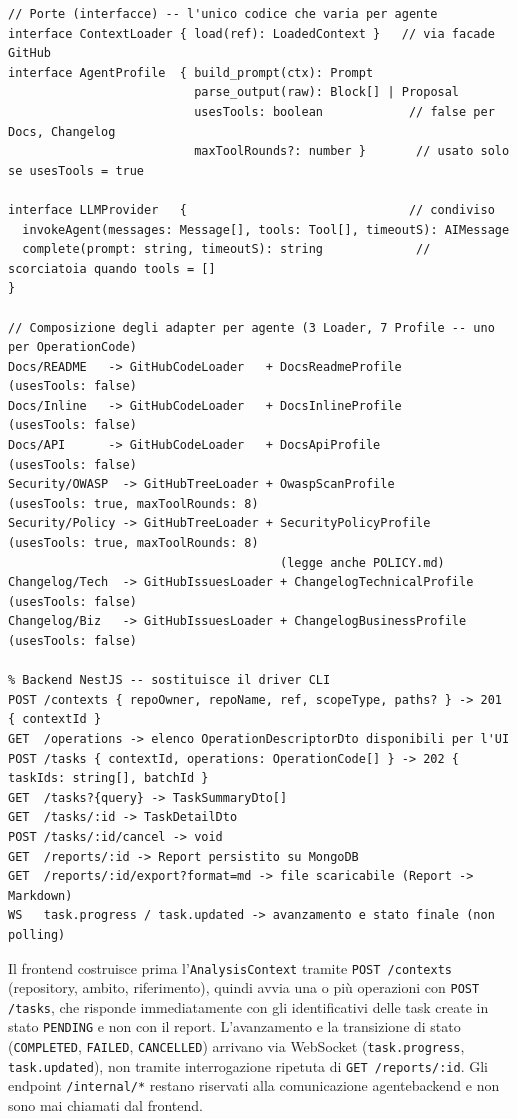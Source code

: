 \documentclass[11pt,a4paper]{article}
\begin{document}
\begin{lstlisting}[caption={Porte dell'agente e composizione degli adapter. ContextLoader e AgentProfile variano per agente; il ciclo di tool-calling è parte dello scheletro condiviso ma è attivo solo per i profili con usesTools=true.}]
// Porte (interfacce) -- l'unico codice che varia per agente
interface ContextLoader { load(ref): LoadedContext }   // via facade GitHub
interface AgentProfile  { build_prompt(ctx): Prompt
                          parse_output(raw): Block[] | Proposal
                          usesTools: boolean            // false per Docs, Changelog
                          maxToolRounds?: number }       // usato solo se usesTools = true

interface LLMProvider   {                               // condiviso
  invokeAgent(messages: Message[], tools: Tool[], timeoutS): AIMessage
  complete(prompt: string, timeoutS): string             // scorciatoia quando tools = []
}

// Composizione degli adapter per agente (3 Loader, 7 Profile -- uno per OperationCode)
Docs/README   -> GitHubCodeLoader   + DocsReadmeProfile        (usesTools: false)
Docs/Inline   -> GitHubCodeLoader   + DocsInlineProfile        (usesTools: false)
Docs/API      -> GitHubCodeLoader   + DocsApiProfile           (usesTools: false)
Security/OWASP  -> GitHubTreeLoader + OwaspScanProfile         (usesTools: true, maxToolRounds: 8)
Security/Policy -> GitHubTreeLoader + SecurityPolicyProfile    (usesTools: true, maxToolRounds: 8)
                                      (legge anche POLICY.md)
Changelog/Tech  -> GitHubIssuesLoader + ChangelogTechnicalProfile (usesTools: false)
Changelog/Biz   -> GitHubIssuesLoader + ChangelogBusinessProfile  (usesTools: false)

% Backend NestJS -- sostituisce il driver CLI
POST /contexts { repoOwner, repoName, ref, scopeType, paths? } -> 201 { contextId }
GET  /operations -> elenco OperationDescriptorDto disponibili per l'UI
POST /tasks { contextId, operations: OperationCode[] } -> 202 { taskIds: string[], batchId }
GET  /tasks?{query} -> TaskSummaryDto[]
GET  /tasks/:id -> TaskDetailDto
POST /tasks/:id/cancel -> void
GET  /reports/:id -> Report persistito su MongoDB
GET  /reports/:id/export?format=md -> file scaricabile (Report -> Markdown)
WS   task.progress / task.updated -> avanzamento e stato finale (non polling)
\end{lstlisting}

Il frontend costruisce prima l'\texttt{AnalysisContext} tramite
\texttt{POST /contexts} (repository, ambito, riferimento), quindi avvia
una o più operazioni con \texttt{POST /tasks}, che risponde immediatamente
con gli identificativi delle task create in stato \texttt{PENDING} e non
con il report. L'avanzamento e la transizione di stato (\texttt{COMPLETED},
\texttt{FAILED}, \texttt{CANCELLED}) arrivano via WebSocket
(\texttt{task.progress}, \texttt{task.updated}), non tramite interrogazione
ripetuta di \texttt{GET /reports/:id}. Gli endpoint \texttt{/internal/*}
restano riservati alla comunicazione agente\textrightarrow{}backend e non
sono mai chiamati dal frontend.
\end{document}
